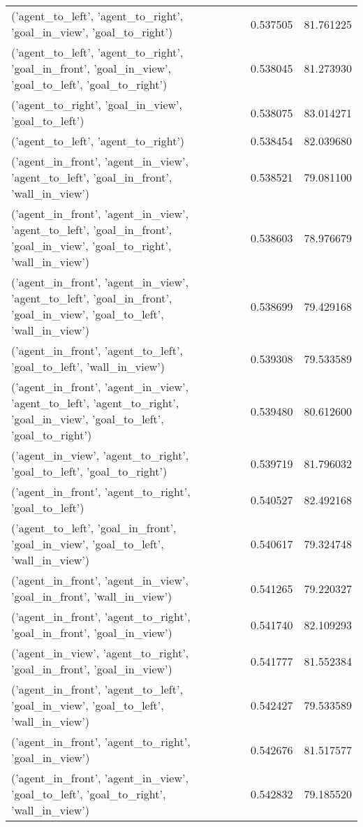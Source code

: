 \begin{tabular}{lrr}
('agent\_to\_left', 'agent\_to\_right', 'goal\_in\_view', 'goal\_to\_right') & 0.537505 & 81.761225 \\
('agent\_to\_left', 'agent\_to\_right', 'goal\_in\_front', 'goal\_in\_view', 'goal\_to\_left', 'goal\_to\_right') & 0.538045 & 81.273930 \\
('agent\_to\_right', 'goal\_in\_view', 'goal\_to\_left') & 0.538075 & 83.014271 \\
('agent\_to\_left', 'agent\_to\_right') & 0.538454 & 82.039680 \\
('agent\_in\_front', 'agent\_in\_view', 'agent\_to\_left', 'goal\_in\_front', 'wall\_in\_view') & 0.538521 & 79.081100 \\
('agent\_in\_front', 'agent\_in\_view', 'agent\_to\_left', 'goal\_in\_front', 'goal\_in\_view', 'goal\_to\_right', 'wall\_in\_view') & 0.538603 & 78.976679 \\
('agent\_in\_front', 'agent\_in\_view', 'agent\_to\_left', 'goal\_in\_front', 'goal\_in\_view', 'goal\_to\_left', 'wall\_in\_view') & 0.538699 & 79.429168 \\
('agent\_in\_front', 'agent\_to\_left', 'goal\_to\_left', 'wall\_in\_view') & 0.539308 & 79.533589 \\
('agent\_in\_front', 'agent\_in\_view', 'agent\_to\_left', 'agent\_to\_right', 'goal\_in\_view', 'goal\_to\_left', 'goal\_to\_right') & 0.539480 & 80.612600 \\
('agent\_in\_view', 'agent\_to\_right', 'goal\_to\_left', 'goal\_to\_right') & 0.539719 & 81.796032 \\
('agent\_in\_front', 'agent\_to\_right', 'goal\_to\_left') & 0.540527 & 82.492168 \\
('agent\_to\_left', 'goal\_in\_front', 'goal\_in\_view', 'goal\_to\_left', 'wall\_in\_view') & 0.540617 & 79.324748 \\
('agent\_in\_front', 'agent\_in\_view', 'goal\_in\_front', 'wall\_in\_view') & 0.541265 & 79.220327 \\
('agent\_in\_front', 'agent\_to\_right', 'goal\_in\_front', 'goal\_in\_view') & 0.541740 & 82.109293 \\
('agent\_in\_view', 'agent\_to\_right', 'goal\_in\_front', 'goal\_in\_view') & 0.541777 & 81.552384 \\
('agent\_in\_front', 'agent\_to\_left', 'goal\_in\_view', 'goal\_to\_left', 'wall\_in\_view') & 0.542427 & 79.533589 \\
('agent\_in\_front', 'agent\_to\_right', 'goal\_in\_view') & 0.542676 & 81.517577 \\
('agent\_in\_front', 'agent\_in\_view', 'goal\_to\_left', 'goal\_to\_right', 'wall\_in\_view') & 0.542832 & 79.185520 \\

\end{tabular}
